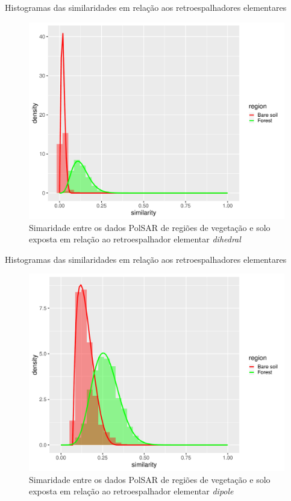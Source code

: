 \documentclass{beamer} %
\begin{document}
\begin{frame}{Histogramas das similaridades em relação aos retroespalhadores elementares}

\begin{figure}
    \centering
    \includegraphics[width = .6\linewidth]{di.pdf}
    \caption{Simaridade entre os dados PolSAR de regiões de vegetação e solo exposta em relação ao retroespalhador elementar \textit{dihedral}}
    \label{fig:di}
\end{figure}
    
\end{frame}

\begin{frame}{Histogramas das similaridades em relação aos retroespalhadores elementares}

\begin{figure}
    \centering
    \includegraphics[width = .6\linewidth]{dip.pdf}
    \caption{Simaridade entre os dados PolSAR de regiões de vegetação e solo exposta em relação ao retroespalhador elementar \textit{dipole}}
    \label{fig:dip}
\end{figure}
    
\end{frame}
\end{document}
